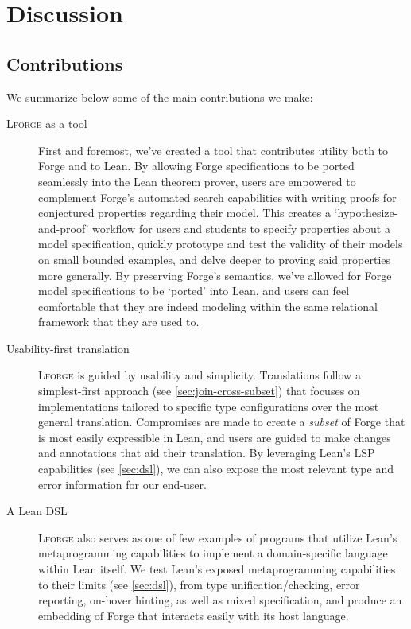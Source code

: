 \section{Discussion}
\subsection{Contributions}

We summarize below some of the main contributions we make:

\begin{description}
    \item[\textsc{Lforge} as a tool] First and foremost, we've created a tool that contributes utility both to Forge and to Lean. By allowing Forge specifications to be ported seamlessly into the Lean theorem prover, users are empowered to complement Forge's automated search capabilities with writing proofs for conjectured properties regarding their model. This creates a `hypothesize-and-proof' workflow for users and students to specify properties about a model specification, quickly prototype and test the validity of their models on small bounded examples, and delve deeper to proving said properties more generally. By preserving Forge's semantics, we've allowed for Forge model specifications to be `ported' into Lean, and users can feel comfortable that they are indeed modeling within the same relational framework that they are used to. 
    \item[Usability-first translation] \textsc{Lforge} is guided by usability and simplicity. Translations follow a simplest-first approach (see \cref{sec:join-cross-subset}) that focuses on implementations tailored to specific type configurations over the most general translation. Compromises are made to create a \emph{subset} of Forge that is most easily expressible in Lean, and users are guided to make changes and annotations that aid their translation. By leveraging Lean's LSP capabilities (see \cref{sec:dsl}), we can also expose the most relevant type and error information for our end-user. 
    \item[A Lean DSL] \textsc{Lforge} also serves as one of few examples of programs that utilize Lean's metaprogramming capabilities to implement a domain-specific language within Lean itself. We test Lean's exposed metaprogramming capabilities to their limits (see \cref{sec:dsl}), from type unification/checking, error reporting, on-hover hinting, as well as mixed specification, and produce an embedding of Forge that interacts easily with its host language. 
\end{description}

